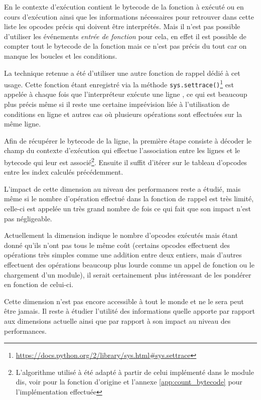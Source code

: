 En \Python le contexte d'exécution contient le \gls{bytecode} de la fonction à exécuté ou en cours d'exécution ainsi que les informations nécessaires pour retrouver dans cette liste les \gls{opcodes} précis qui doivent être interprétés. Mais il n'est pas possible d'utiliser les événements \emph{entrée de fonction} pour cela, en effet il est possible de compter tout le bytecode de la fonction mais ce n'est pas précis du tout car on manque les boucles et les conditions.

La technique retenue a été d'utiliser une autre fonction de rappel dédié à cet usage. Cette fonction étant enregistré via la méthode \verb|sys.settrace()|\footnote{\url{https://docs.python.org/2/library/sys.html#sys.settrace}} est appelée à chaque fois que l'interpréteur exécute une ligne \Python, ce qui est beaucoup plus précis même si il reste une certaine imprévision liée à l'utilisation de conditions en ligne et autres cas où plusieurs opérations sont effectuées sur la même ligne.

Afin de récupérer le bytecode de la ligne, la première étape consiste à décoder le champ du contexte d'exécution qui effectue l'association entre les lignes et le bytecode qui leur est associé\footnote{L'algorithme utilisé à été adapté à partir de celui implémenté dans le module dis, voir \url{} pour la fonction d'origine et l'annexe \vref{app:count_bytecode} pour l'implémentation effectuée}. Ensuite il suffit d'itérer sur le tableau d'opcodes entre les index calculés précédemment.

\begin{note}[Performances]
L'impact de cette dimension au niveau des performances reste a étudié, mais même si le nombre d'opération effectué dans la fonction de rappel est très limité, celle-ci est appelée un très grand nombre de fois ce qui fait que son impact n'est pas négligeable.
\end{note}

\begin{note}[Évolutions]
Actuellement la dimension indique le nombre d'\gls{opcodes} exécutés mais étant donné qu'ils n'ont pas tous le même coût (certains opcodes effectuent des opérations très simples comme une addition entre deux entiers, mais d'autres effectuent des opérations beaucoup plus lourde comme un appel de fonction ou le chargement d'un module), il serait certainement plus intéressant de les pondérer en fonction de celui-ci.
\end{note}

\begin{note}
Cette dimension n'est pas encore accessible à tout le monde et ne le sera peut être jamais. Il reste à étudier l'utilité des informations quelle apporte par rapport aux dimensions actuelle ainsi que par rapport à son impact au niveau des performances.
\end{note}


